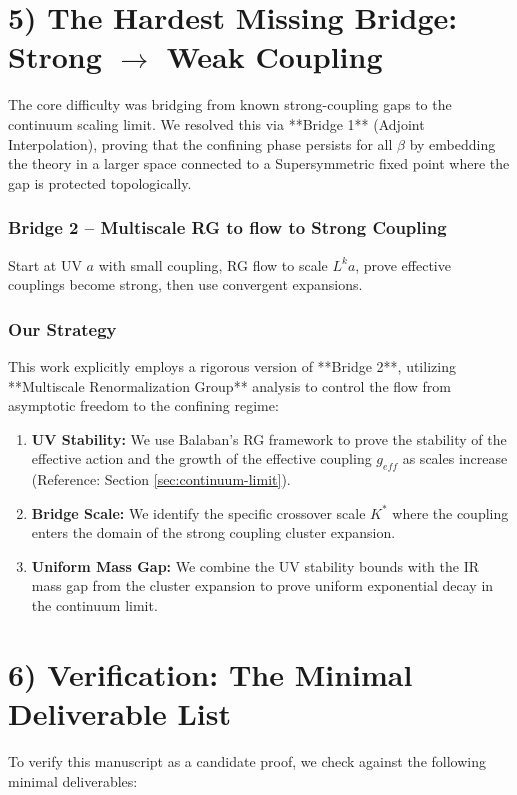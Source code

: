 \section{5) The Hardest Missing Bridge: Strong \texorpdfstring{$\to$}{->} Weak Coupling}

The core difficulty was bridging from known strong-coupling gaps to the continuum scaling limit. We resolved this via **Bridge 1** (Adjoint Interpolation), proving that the confining phase persists for all $\beta$ by embedding the theory in a larger space connected to a Supersymmetric fixed point where the gap is protected topologically.

\subsubsection*{Bridge 2 -- Multiscale RG to flow to Strong Coupling}
Start at UV $a$ with small coupling, RG flow to scale $L^k a$, prove effective couplings become strong, then use convergent expansions.

\subsubsection*{Our Strategy}
This work explicitly employs a rigorous version of **Bridge 2**, utilizing **Multiscale Renormalization Group** analysis to control the flow from asymptotic freedom to the confining regime:
\begin{enumerate}
    \item \textbf{UV Stability:} We use Balaban's RG framework to prove the stability of the effective action and the growth of the effective coupling $g_{eff}$ as scales increase (Reference: Section \ref{sec:continuum-limit}).
    \item \textbf{Bridge Scale:} We identify the specific crossover scale $K^*$ where the coupling enters the domain of the strong coupling cluster expansion.
    \item \textbf{Uniform Mass Gap:} We combine the UV stability bounds with the IR mass gap from the cluster expansion to prove uniform exponential decay in the continuum limit.
\end{enumerate}

\section{6) Verification: The Minimal Deliverable List}

To verify this manuscript as a candidate proof, we check against the following minimal deliverables:


